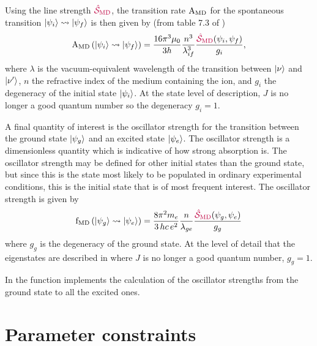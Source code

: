 \documentclass[11pt, twoside,openright]{article}
\begin{document}


Using the line strength $\textcolor{purple}{\hat{\mathcal{S}}_\text{MD}}$, the transition rate $\text{A}_\text{MD}$ for the spontaneous transition $|\psi_i\rangle \rightsquigarrow |\psi_f\rangle$ is then given by (from table 7.3 of \cite{thorne_spectrophysics_1999})
\begin{equation}
	\text{A}_\text{MD}\left(|\psi_i\rangle \rightsquigarrow |\psi_f\rangle\right) = \frac{16 \pi^3 \mu_0}{3 h} \frac{n^3}{\lambda_{if}^3} \frac{\textcolor{purple}{\hat{\mathcal{S}}_\text{MD}}(\psi_i,\psi_f)}{g_i},
\end{equation}
where $\lambda$ is the vacuum-equivalent wavelength of the transition between $|\nu\rangle$ and $|\nu'\rangle$, $n$ the refractive index of the medium containing the ion, and $g_i$ the degeneracy of the initial state $|\psi_i\rangle$. At the state level of description, $J$ is no longer a good quantum number so the degeneracy $g_i=1$. 

 
 
A final quantity of interest is the oscillator strength for the transition between the ground state $|\psi_g\rangle$ and an excited state $|\psi_e\rangle$. The oscillator strength is a dimensionless quantity which is indicative of how strong absorption is. The oscillator strength may be defined for other initial states than the ground state, but since this is the state most likely to be populated in ordinary experimental conditions, this is the initial state that is of most frequent interest. The oscillator strength is given by \cite{carnall_spectral_1965}
\begin{equation}
	\text{f}_\text{MD}\left(|\psi_g\rangle \rightsquigarrow |\psi_e\rangle\right) = \frac{8 \pi^2 m_{e}}{3\,hc\,e^2} 
	\frac{n}{\lambda_{ge}}
	\frac{\textcolor{purple}{\hat{\mathcal{S}}_\text{MD}}(\psi_g,\psi_e)}{g_g}
\end{equation}
where $g_g$ is the degeneracy of the ground state. At the level of detail that the eigenstates are described in \qlanth where $J$ is no longer a good quantum number, $g_g = 1$. 

In \qlanth the function  implements the calculation of the oscillator strengths from the ground state to all the excited ones.

 

\section{Parameter constraints}\label{section:param-constraints}
\end{document}
